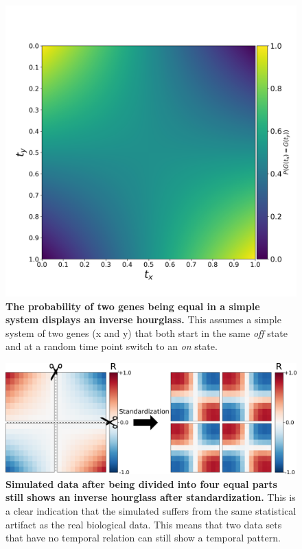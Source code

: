 \begin{figure}[H]
    \center
    \includegraphics[width=0.5\linewidth]{ch.hourglass/images/math_inverse.png}
    \caption{\textbf{The probability of two genes being equal in a simple system displays an inverse hourglass.} This assumes a simple system of two genes (x and y) that both start in the same \textit{off} state and at a random time point switch to an \textit{on} state. }\label{fig:inverse_math}
\end{figure}

\begin{figure}[H]
    \center
    \includegraphics[width=\linewidth]{ch.hourglass/images/sim_normalisation.png}
    \caption{\textbf{Simulated data after being divided into four equal parts still shows an inverse hourglass after standardization.} This is a clear indication that the simulated suffers from the same statistical artifact as the real biological data. This means that two data sets that have no temporal relation can still show a temporal pattern.}
    \label{fig:sim_normalisation}
\end{figure}

